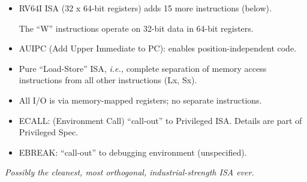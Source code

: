 \documentclass{article}
\newcommand{\hmm}{\hspace*{2em}}
\newcommand{\ie}{\emph{i.e.,}}
\begin{document}
\begin{center}
\begin{minipage}[t]{6in}
\begin{itemize}
  \item RV64I ISA (32 x 64-bit registers) adds 15 more instructions
    (below).

    \hmm {}

    The ``W'' instructions operate on 32-bit data in 64-bit registers.

  \end{itemize}

  \vspace{0.1in}

  \begin{itemize}\large

  \item AUIPC (Add Upper Immediate to PC): enables position-independent code.

  \item Pure ``Load-Store'' ISA, {\ie} complete separation of memory
    access instructions from all other instructions (Lx, Sx).

  \item All I/O is via memory-mapped registers; no separate instructions.

  \item ECALL: (Environment Call) ``call-out'' to Privileged ISA.
    Details are part of Privileged Spec.

  \item EBREAK: ``call-out'' to debugging environment (unspecified).

  \end{itemize}
  {\Large \emph{Possibly the cleanest, most orthogonal, industrial-strength ISA ever.}}
\end{minipage}

\end{center}

\clearpage

\end{document}
